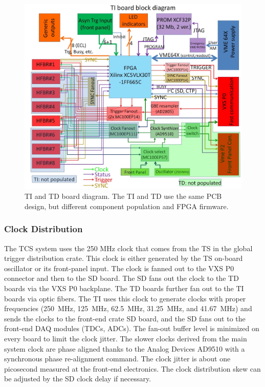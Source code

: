 \begin{figure}[hbt]
	\centering
	\includegraphics[width=1.0\columnwidth,keepaspectratio]{img/TIdiagram.jpg}
	\caption{TI and TD board diagram. The TI and TD use the same PCB design, but different component population
          and FPGA firmware.}
	\label{fig:TIdiagram}
\end{figure}

\subsubsection{Clock Distribution}

The TCS system uses the 250 MHz clock that comes from the TS in the global trigger distribution crate. This clock is
either generated by the TS on-board oscillator or its front-panel input. The clock is fanned out to the VXS P0 connector
and then to the SD board. The SD fans out the clock to the TD boards via the VXS P0 backplane. The TD boards further
fan out to the TI boards via optic fibers.  The TI uses this clock to generate clocks with proper frequencies (250~MHz,
125~MHz, 62.5~MHz, 31.25~MHz, and 41.67~MHz) and sends the clocks to the front-end crate SD board, and the SD
fans out to the front-end DAQ modules (TDCs, ADCs). The fan-out buffer level is minimized on every board to limit the
clock jitter. The slower clocks derived from the main system clock are phase aligned thanks to the Analog Devices
AD9510 with a synchronous phase re-alignment command.  The clock jitter is about one picosecond measured at the
front-end electronics.  The clock distribution skew can be adjusted by the SD clock delay if necessary.

